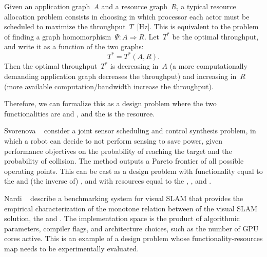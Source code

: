 Given an application graph~$A$ and a resource graph~$R$, a typical resource allocation problem consists in choosing in which processor each actor must be scheduled to maximize the throughput~$T$~[Hz].
This is equivalent to the problem of finding a graph homomorphism~$\Psi \colon A \Rightarrow R$.
Let~$T^{\ast}$ be the optimal throughput, and write it as a function of the two graphs:
\begin{equation}
    T^{\ast}=T^{\ast}(A,R).
\end{equation}
Then the optimal throughput~$T^{\ast}$ is decreasing in~$A$ (a more computationally demanding application graph decreases the throughput) and increasing in~$R$ (more available computation/bandwidth increase the throughput).

Therefore, we can formalize this as a design problem where the two functionalities are  and , and the  is the resource.

\begin{figure*}[h!]
    \centering
    \caption{}
\end{figure*}

\begin{example}
    Svorenova\,\,\etal~\cite{svorenova16resource} consider a joint sensor scheduling and control synthesis problem, in which a robot can decide to not perform sensing to save power, given performance objectives on the probability of reaching the target and the probability of collision.
    The method outputs a Pareto frontier of all possible operating points.
    This can be cast as a design problem with functionality equal to the  and (the inverse of) , and with resources equal to the
    , , and .
\end{example}

\begin{figure}[h]
    \centering
    \caption{}
    \label{fig:progressive-1-1}
\end{figure}

\begin{example}
    Nardi\,\,\etal~\cite{zia16comparative} describe a benchmarking system for visual SLAM that provides the empirical characterization of the monotone relation between  of the visual SLAM solution, the  and .
    The implementation space is the product of algorithmic parameters, compiler flags, and architecture choices, such as the number of GPU cores active.
    This is an example of a design problem whose functionality-resources map needs to be experimentally evaluated.
\end{example}

